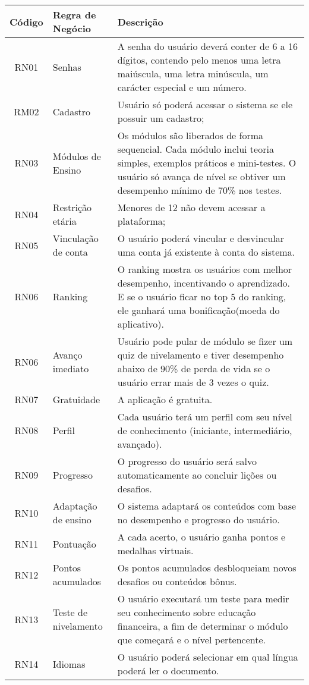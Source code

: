 \documentclass[
	article,			%
	12pt,				%
	oneside,			%
	a4paper,			%
	english,			%
	brazil,				%
	sumario=tradicional
	]{abntex2}
\begin{document}
\begin{tabular}{|c|l|p{8cm}|}
\hline
\textbf{Código} & \textbf{Regra de Negócio} & \textbf{Descrição} \\
\hline
RN01 & Senhas & A senha do usuário deverá conter de 6 a 16 dígitos, contendo pelo menos uma letra maiúscula, uma letra minúscula, um carácter especial e um número. \\
\hline
RM02 & Cadastro & Usuário só poderá acessar o sistema se ele possuir um cadastro; \\
\hline
RN03 & Módulos de Ensino & Os módulos são liberados de forma sequencial. Cada módulo inclui teoria simples, exemplos práticos e mini-testes. O usuário só avança de nível se obtiver um desempenho mínimo de 70\% nos testes. \\
\hline
RN04 & Restrição etária & Menores de 12 não devem acessar a plataforma; \\
\hline
RN05 & Vinculação de conta & O usuário poderá vincular e desvincular uma conta já existente à conta do sistema. \\
\hline
RN06 & Ranking &  O ranking mostra os usuários com melhor desempenho, incentivando o aprendizado. E se o usuário ficar no top 5 do ranking, ele ganhará uma bonificação(moeda do aplicativo). \\
\hline
RN06 & Avanço imediato & Usuário pode pular de módulo se fizer um quiz de nivelamento e tiver desempenho abaixo de 90\% de perda de vida se o usuário errar mais de 3 vezes o quiz.\\
\hline
RN07 & Gratuidade & A aplicação é gratuita.\\
\hline
RN08 & Perfil & Cada usuário terá um perfil com seu nível de conhecimento (iniciante, intermediário, avançado).\\
\hline
RN09 & Progresso & O progresso do usuário será salvo automaticamente ao concluir lições ou desafios. \\
\hline
RN10 & Adaptação de ensino & O sistema adaptará os conteúdos com base no desempenho e progresso do usuário.\\
\hline
RN11 & Pontuação & A cada acerto, o usuário ganha pontos e medalhas virtuais. \\
\hline
RN12 & Pontos acumulados & Os pontos acumulados desbloqueiam novos desafios ou conteúdos bônus. \\
\hline
RN13 & Teste de nivelamento & O usuário executará um teste para medir seu conhecimento sobre educação financeira, a fim de determinar o módulo que começará e o nível pertencente. \\
\hline
RN14 & Idiomas & O usuário poderá selecionar em qual língua poderá ler o documento. \\
\hline
\end{tabular}
\end{document}
